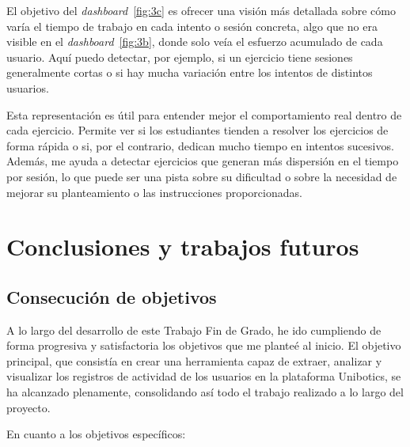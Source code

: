 \documentclass[a4paper, 12pt]{book}
\begin{document}
El objetivo del \textit{dashboard}~\ref{fig:3c} es ofrecer una visión más detallada sobre cómo varía el tiempo de trabajo en cada intento o sesión concreta, algo que no era visible en el \textit{dashboard}~\ref{fig:3b}, donde solo veía el esfuerzo acumulado de cada usuario. Aquí puedo detectar, por ejemplo, si un ejercicio tiene sesiones generalmente cortas o si hay mucha variación entre los intentos de distintos usuarios.

Esta representación es útil para entender mejor el comportamiento real dentro de cada ejercicio. Permite ver si los estudiantes tienden a resolver los ejercicios de forma rápida o si, por el contrario, dedican mucho tiempo en intentos sucesivos. Además, me ayuda a detectar ejercicios que generan más dispersión en el tiempo por sesión, lo que puede ser una pista sobre su dificultad o sobre la necesidad de mejorar su planteamiento o las instrucciones proporcionadas.


\cleardoublepage



\chapter{Conclusiones y trabajos futuros}
\label{chap:conclusiones}


\section{Consecución de objetivos}
\label{sec:consecucion-objetivos}

A lo largo del desarrollo de este Trabajo Fin de Grado, he ido cumpliendo de forma progresiva y satisfactoria los objetivos que me planteé al inicio. El objetivo principal, que consistía en crear una herramienta capaz de extraer, analizar y visualizar los registros de actividad de los usuarios en la plataforma Unibotics, se ha alcanzado plenamente, consolidando así todo el trabajo realizado a lo largo del proyecto.

En cuanto a los objetivos específicos:
\end{document}
